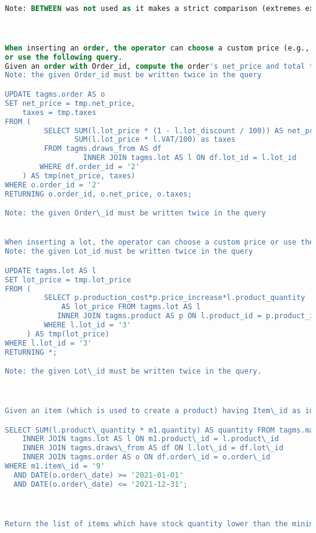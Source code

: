 \begin{lstlisting}[language=SQL,
keywordstyle=\color{blue},
stringstyle=\color{mauve},
showstringspaces=false,
basicstyle=\ttfamily\footnotesize]
Note: BETWEEN was not used as it makes a strict comparison (extremes excluded).



When inserting an order, the operator can choose a custom price (e.g., decided with the customer)
or use the following query.
Given an order with Order_id, compute the order's net_price and total taxes.
Note: the given Order_id must be written twice in the query

UPDATE tagms.order AS o
SET net_price = tmp.net_price,
    taxes = tmp.taxes
FROM (
         SELECT SUM(l.lot_price * (1 - l.lot_discount / 100)) AS net_price,
                SUM(l.lot_price * l.VAT/100) as taxes
         FROM tagms.draws_from AS df
                  INNER JOIN tagms.lot AS l ON df.lot_id = l.lot_id
        WHERE df.order_id = '2'
    ) AS tmp(net_price, taxes)
WHERE o.order_id = '2'
RETURNING o.order_id, o.net_price, o.taxes;

Note: the given Order\_id must be written twice in the query


When inserting a lot, the operator can choose a custom price or use the following query.Given a lot with Lot_id, compute the lot price
Note: the given Lot_id must be written twice in the query

UPDATE tagms.lot AS l
SET lot_price = tmp.lot_price
FROM (
         SELECT p.production_cost*p.price_increase*l.product_quantity
             AS lot_price FROM tagms.lot AS l
            INNER JOIN tagms.product AS p ON l.product_id = p.product_id
         WHERE l.lot_id = '3'
     ) AS tmp(lot_price)
WHERE l.lot_id = '3'
RETURNING *;

Note: the given Lot\_id must be written twice in the query.



Given an item (which is used to create a product) having Item\_id as identifier and a time interval (actually, two dates), find the total quantity of that item that has been used for production or packaging during that time.

SELECT SUM(l.product\_quantity * m1.quantity) AS quantity FROM tagms.made\_up\_of\_1 AS m1
    INNER JOIN tagms.lot AS l ON m1.product\_id = l.product\_id
    INNER JOIN tagms.draws\_from AS df ON l.lot\_id = df.lot\_id
    INNER JOIN tagms.order AS o ON df.order\_id = o.order\_id
WHERE m1.item\_id = '9'
  AND DATE(o.order\_date) >= '2021-01-01'
  AND DATE(o.order\_date) <= '2021-12-31';



Return the list of items which have stock quantity lower than the minimum one.


\end{lstlisting}
